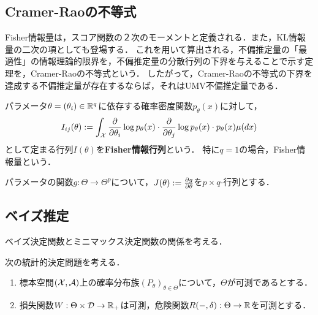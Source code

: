 \documentclass[uplatex,dvipdfmx]{jsreport}
\begin{document}
\subsection{Cramer-Raoの不等式}

\begin{tcolorbox}[colframe=ForestGreen, colback=ForestGreen!10!white,breakable,colbacktitle=ForestGreen!40!white,coltitle=black,fonttitle=\bfseries\sffamily,
title=]
    Fisher情報量は，スコア関数の２次のモーメントと定義される．また，KL情報量の二次の項としても登場する．
    これを用いて算出される，不偏推定量の「最適性」の情報理論的限界を，不偏推定量の分散行列の下界を与えることで示す定理を，Cramer-Raoの不等式という．
    したがって，Cramer-Raoの不等式の下界を達成する不偏推定量が存在するならば，それはUMV不偏推定量である．
\end{tcolorbox}

\begin{definition}
    パラメータ$\theta=(\theta_i)\in\mathbb{R}^q$に依存する確率密度関数$p_\theta(x)$に対して，
    \[I_{ij}(\theta):=\int_{\mathcal{X}}\frac{\partial }{\partial \theta_i}\log p_\theta(x)\cdot\frac{\partial }{\partial \theta_j}\log p_\theta(x)\cdot p_\theta(x)\mu(dx)\]
    として定まる行列$I(\theta)$を\textbf{Fisher情報行列}という．
    特に$q=1$の場合，Fisher情報量という．
\end{definition}

\begin{notation}
    パラメータの関数$g:\Theta\to\Theta^p$について，$J(\theta):=\frac{\partial g}{\partial \theta}$を$p\times q$-行列とする．
\end{notation}

\begin{theorem}
    
\end{theorem}

\subsection{ベイズ推定}

\begin{tcolorbox}[colframe=ForestGreen, colback=ForestGreen!10!white,breakable,colbacktitle=ForestGreen!40!white,coltitle=black,fonttitle=\bfseries\sffamily,
title=]
    ベイズ決定関数とミニマックス決定関数の関係を考える．
\end{tcolorbox}

\begin{notation}
    次の統計的決定問題を考える．
    \begin{enumerate}
        \item 標本空間$(\mathcal{X},\mathcal{A})$上の確率分布族$(P_\theta)_{\theta\in\Theta}$について，$\Theta$が可測であるとする．
        \item 損失関数$W:\Theta\times\mathcal{D}\to\mathbb{R}_+$は可測，危険関数$R(-,\delta):\Theta\to\mathbb{R}$を可測とする．
    \end{enumerate}
\end{notation}
\end{document}
